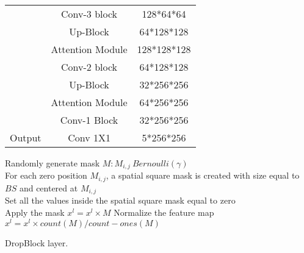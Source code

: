 \documentclass[journal]{IEEEtran}
\begin{document}
\begin{table}[t]
{\begin{tabular}{@{}l|c|c@{}}
                                               & Conv-3 block           & 128*64*64   \\
                                               & Up-Block               & 64*128*128  \\
                                               & Attention Module       & 128*128*128 \\
                                               & Conv-2 block           & 64*128*128  \\
                                               & Up-Block               & 32*256*256  \\
                                               & Attention Module       & 64*256*256  \\
                                               & Conv-1 Block           & 32*256*256  \\ \midrule
Output                                         & Conv 1X1               & 5*256*256   \\ \bottomrule
\end{tabular}}
\end{table}

\begin{algorithm}
\SetAlgoLined
{}

Randomly generate mask $M:M_{i,j}~ Bernoulli(\gamma)$\\
For each zero position $M_{i,j}$, a spatial square mask is created with size equal to $BS$ and centered at $M_{i,j}$\\
Set all the values inside the spatial square mask equal to zero\\
Apply the mask $x^l=x^l\times M$
Normalize the feature map $x^l=x^l \times count(M)/count-ones(M)$
\caption{DropBlock layer.}
\end{algorithm}
\end{document}
